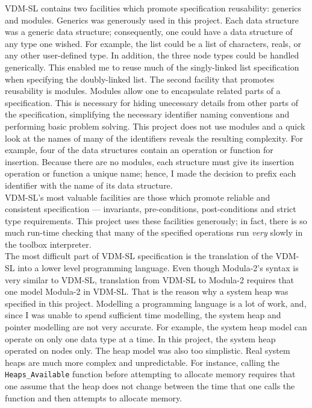 \documentclass[11pt]{article}
\begin{document}
VDM-SL contains two facilities which promote specification reusability:  generics and modules.  Generics was generously used in this project.  Each data structure was a generic data structure; consequently, one could have a data structure of any type one wished.  For example, the list could be a list of characters, reals, or any other user-defined type.  In addition, the three node types could be handled generically.  This enabled me to reuse much of the singly-linked list specification when specifying the doubly-linked list.  The second facility that promotes reusability is modules.  Modules allow one to encapsulate related parts of a specification.  This is necessary for hiding unecessary details from other parts of the specification, simplifying the necessary identifier naming conventions and performing basic problem solving.  This project does not use modules and a quick look at the names of many of the identifiers reveals the resulting complexity.  For example, four of the data structures contain an operation or function for insertion.  Because there are no modules, each structure must give its insertion operation or function a unique name; hence, I made the decision to prefix each identifier with the name of its data structure.\\

VDM-SL's most valuable facilities are those which promote reliable and consistent specification --- invariants, pre-conditions, post-conditions and strict type requirements.  This project uses these facilities generously; in fact, there is so much run-time checking that many of the specified operations run {\em very} slowly in the toolbox interpreter.  \\

The most difficult part of VDM-SL specification is the translation of the VDM-SL into a lower level programming language.  Even though Modula-2's syntax is very similar to VDM-SL, translation from VDM-SL to Modula-2 requires that one model Modula-2 in VDM-SL.  That is the reason why a system heap was specified in this project.  Modelling a programming language is a lot of work, and, since I was unable to spend sufficient time modelling, the system heap and pointer modelling are not very accurate.  For example, the system heap model can operate on only one data type at a time.  In this project, the system heap operated on nodes only.  The heap model was also too simplistic.  Real system heaps are much more complex and unpredictable.  For instance, calling the {\tt Heaps\_Available} function before attempting to allocate memory requires that one assume that the heap does not change between the time that one calls the function and then attempts to allocate memory.  \\
\end{document}
